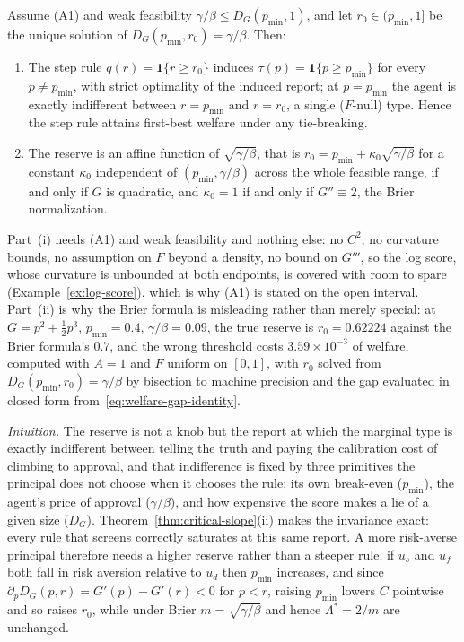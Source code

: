 \documentclass[acmsmall,nonacm,screen]{acmart}
\theoremstyle{acmplain}%
\theoremstyle{acmdefinition}%
\numberwithin{equation}{section}
\begin{document}
\begin{theorem}\label{thm:reserve}
Assume (A1) and weak feasibility $\gamma/\beta \le D_G(p_{\min},1)$, and let $r_0 \in (p_{\min},1]$ be the unique solution of $D_G(p_{\min},r_0) = \gamma/\beta$. Then:
\begin{enumerate}
\item[(i)] The step rule $q(r) = \mathbf 1\{r \ge r_0\}$ induces $\tau(p) = \mathbf 1\{p \ge p_{\min}\}$ for every $p \ne p_{\min}$, with strict optimality of the induced report; at $p = p_{\min}$ the agent is exactly indifferent between $r = p_{\min}$ and $r = r_0$, a single ($F$-null) type. Hence the step rule attains first-best welfare under any tie-breaking.
\item[(ii)] The reserve is an affine function of $\sqrt{\gamma/\beta}$, that is $r_0 = p_{\min} + \kappa_0\sqrt{\gamma/\beta}$ for a constant $\kappa_0$ independent of $(p_{\min},\gamma/\beta)$ across the whole feasible range, if and only if $G$ is quadratic, and $\kappa_0 = 1$ if and only if $G'' \equiv 2$, the Brier normalization.
\end{enumerate}
\end{theorem}

Part~(i) needs (A1) and weak feasibility and nothing else: no $C^2$, no curvature bounds, no assumption on $F$ beyond a density, no bound on $G'''$, so the log score, whose curvature is unbounded at both endpoints, is covered with room to spare (Example~\ref{ex:log-score}), which is why (A1) is stated on the open interval. Part~(ii) is why the Brier formula is misleading rather than merely special: at $G = p^2 + \tfrac12 p^3$, $p_{\min} = 0.4$, $\gamma/\beta = 0.09$, the true reserve is $r_0 = 0.62224$ against the Brier formula's $0.7$, and the wrong threshold costs $3.59 \times 10^{-3}$ of welfare, computed with $A = 1$ and $F$ uniform on $[0,1]$, with $r_0$ solved from $D_G(p_{\min},r_0) = \gamma/\beta$ by bisection to machine precision and the gap evaluated in closed form from~\eqref{eq:welfare-gap-identity}.

\emph{Intuition.} The reserve is not a knob but the report at which the marginal type is exactly indifferent between telling the truth and paying the calibration cost of climbing to approval, and that indifference is fixed by three primitives the principal does not choose when it chooses the rule: its own break-even ($p_{\min}$), the agent's price of approval ($\gamma/\beta$), and how expensive the score makes a lie of a given size ($D_G$). Theorem~\ref{thm:critical-slope}(ii) makes the invariance exact: every rule that screens correctly saturates at this same report. A more risk-averse principal therefore needs a higher reserve rather than a steeper rule: if $u_s$ and $u_f$ both fall in risk aversion relative to $u_d$ then $p_{\min}$ increases, and since $\partial_p D_G(p,r) = G'(p)-G'(r) < 0$ for $p < r$, raising $p_{\min}$ lowers $C$ pointwise and so raises $r_0$, while under Brier $m = \sqrt{\gamma/\beta}$ and hence $\Lambda^* = 2/m$ are unchanged.
\end{document}
